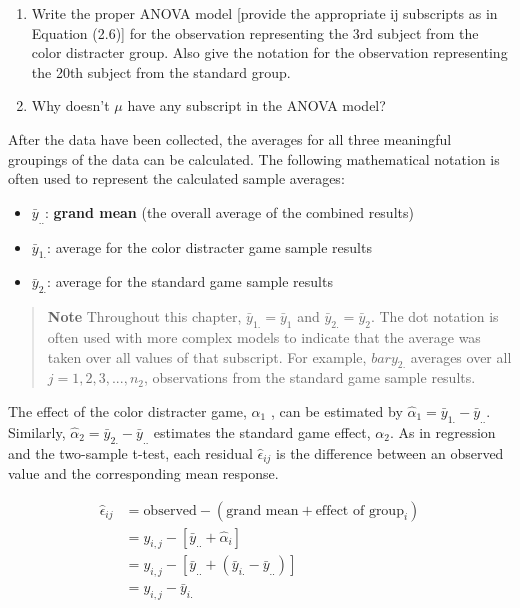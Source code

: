 \documentclass[
]{report}
\providecommand{\tightlist}{%
  \setlength{\itemsep}{0pt}\setlength{\parskip}{0pt}}
\theoremstyle{definition}
\theoremstyle{definition}
\theoremstyle{definition}
\theoremstyle{definition}
\theoremstyle{remark}
\begin{document}
\begin{enumerate}
\def\labelenumi{\arabic{enumi}.}
\setcounter{enumi}{16}
\item
  Write the proper ANOVA model {[}provide the appropriate ij subscripts as in Equation (2.6){]} for the observation representing the 3rd subject from the color distracter group. Also give the notation for the observation representing the 20th subject from the standard group.
\item
  Why doesn't \(\mu\) have any subscript in the ANOVA model?
\end{enumerate}

After the data have been collected, the averages for all three meaningful groupings of the data can be calculated. The following mathematical notation is often used to represent the calculated sample averages:

\begin{itemize}
\tightlist
\item
  \(\bar{y}_{..}\): \textbf{grand mean} (the overall average of the combined results)
\item
  \(\bar{y}_{1.}\): average for the color distracter game sample results
\item
  \(\bar{y}_{2.}\): average for the standard game sample results
\end{itemize}

\begin{quote}
\textbf{Note}
Throughout this chapter, \(\bar{y}_{1.} = \bar{y}_{1}\) and \(\bar{y}_{2.} = \bar{y}_{2}\). The dot notation is often used with more complex models
to indicate that the average was taken over all values of that subscript. For example, \(bar{y}_{2.}\) averages over all
\(j = 1, 2, 3, ... , n_2\), observations from the standard game sample results.
\end{quote}

The effect of the color distracter game, \(\alpha_1\) , can be estimated by \(\hat{\alpha}_1 = \bar{y}_{1.} - \bar{y}_{..}\). Similarly, \(\hat{\alpha}_2 = \bar{y}_{2.} - \bar{y}_{..}\)
estimates the standard game effect, \(\alpha_2\). As in regression and the two-sample t-test, each residual \(\hat{\epsilon}_{ij}\) is the
difference between an observed value and the corresponding mean response.

\[
\begin{aligned}
\hat{\epsilon}_{ij}  
  &= \text{observed} - (\text{grand mean} + \text{effect of group}_i)\\
  &= y_{i,j} - [\bar{y}_{..} + \hat{\alpha}_i]\\
  &= y_{i,j} - [\bar{y}_{..} + (\bar{y}_{i.} - \bar{y}_{..})]\\
  &= y_{i,j} - \bar{y}_{i.}\\
\end{aligned}  
\]
\end{document}
